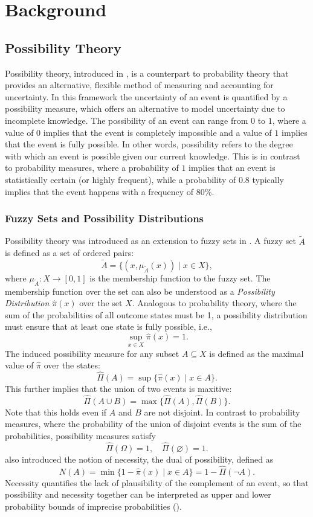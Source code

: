 \documentclass[12pt,a4paper]{report}
\begin{document}
\chapter{Background}
\section{Possibility Theory}

Possibility theory, introduced in \cite{ZADEH19999}, is a counterpart to probability theory that provides an alternative, flexible method of measuring and accounting for uncertainty. In this framework the uncertainty of an event is quantified by a possibility measure, which offers an alternative to model uncertainty due to incomplete knowledge. The possibility of an event can range from $0$ to $1$, where a value of $0$ implies that the event is completely impossible and a value of $1$ implies that the event is fully possible. In other words, possibility refers to the degree with which an event is possible given our current knowledge. This is in contrast to probability measures, where a probability of $1$ implies that an event is statistically certain (or highly frequent), while a probability of $0.8$ typically implies that the event happens with a frequency of 80\%.

\subsection{Fuzzy Sets and Possibility Distributions}
Possibility theory was introduced as an extension to fuzzy sets in \cite{ZADEH19999}. A fuzzy set $\tilde{A}$ is defined as a set of ordered pairs:
\[
  \tilde{A} = \{(x, \mu_{\tilde{A}}(x)) \mid x \in X\},
\]
where $\mu_{\tilde{A}}: X \to [0,1]$ is the membership function to the fuzzy set. The membership function over the set can also be understood as a \emph{Possibility Distribution} $\hat{\pi}(x)$ over the set $X$. Analogous to probability theory, where the sum of the probabilities of all outcome states must be 1, a possibility distribution must ensure that at least one state is fully possible, i.e.,
\[
  \sup_{x \in X} \hat{\pi}(x) = 1.
\]
The induced possibility measure for any subset $A \subseteq X$ is defined as the maximal value of $\hat{\pi}$ over the states:
\[
  \hat{\Pi}(A) = \sup \{ \hat{\pi}(x) \mid x \in A \}.
\]
This further implies that the union of two events is maxitive:
\[
  \hat{\Pi}(A \cup B) = \max\{\hat{\Pi}(A),\hat{\Pi}(B)\}.
\]
Note that this holds even if $A$ and $B$ are not disjoint. In contrast to probability measures, where the probability of the union of disjoint events is the sum of the probabilities, possibility measures satisfy
\[
\hat{\Pi}(\Omega) = 1,\quad \hat{\Pi}(\varnothing) = 1.
\]
\cite{Dubois2001} also introduced the notion of necessity, the dual of possibility, defined as
\[
  N(A) = \min\{1-\hat{\pi}(x) \mid x \in A\} = 1 - \hat{\Pi}(\neg A).
\]
Necessity quantifies the lack of plausibility of the complement of an event, so that possibility and necessity together can be interpreted as upper and lower probability bounds of imprecise probabilities (\cite{DUBOIS199265}).
\end{document}
